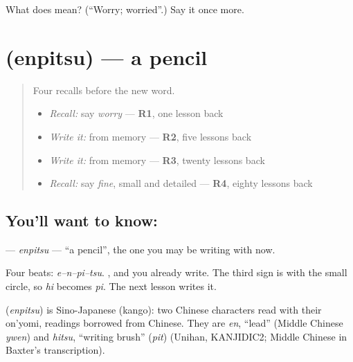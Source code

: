\begin{tcolorbox}[breakable,colback=teal!4,colframe=teal!35!black,title={Before you move on}]
What does  mean? (\textquotedblleft{}Worry; worried\textquotedblright{}.) Say it once more.
\end{tcolorbox}
\section[\texorpdfstring{\ja{えんぴつ} (enpitsu)}{えんぴつ (enpitsu)}]{ (enpitsu) — a pencil}

\label{lesson:JA-C137-enpitsu}



\begin{quote}
Four recalls before the new word.

\begin{itemize}
\raggedright
  \item \emph{Recall:} say \emph{worry} — \textbf{R1}, one lesson back
  \item \emph{Write it:} \textbf{} from memory — \textbf{R2}, five lessons back
  \item \emph{Write it:} \textbf{} from memory — \textbf{R3}, twenty lessons back
  \item \emph{Recall:} say \emph{fine}, small and detailed — \textbf{R4}, eighty lessons back
\end{itemize}
\end{quote}

\subsection*{You'll want to know: }
\textbf{} — \emph{enpitsu} — \textquotedblleft{}a pencil\textquotedblright{}, the one you may be writing with now.

Four beats: \emph{e–n–pi–tsu}. \textbf{}, \textbf{} and \textbf{} you already write. The third sign is \textbf{} with the small circle, so \emph{hi} becomes \emph{pi}. The next lesson writes it.

\begin{cousinweb}
\textbf{} (\emph{enpitsu}) is Sino-Japanese (kango): two Chinese characters read with their on'yomi, readings borrowed from Chinese. They are \emph{en}, \textquotedblleft{}lead\textquotedblright{} (Middle Chinese \emph{ywen}) and \emph{hitsu}, \textquotedblleft{}writing brush\textquotedblright{} (\emph{pit}) (Unihan, KANJIDIC2; Middle Chinese in Baxter's transcription).
\end{cousinweb}

